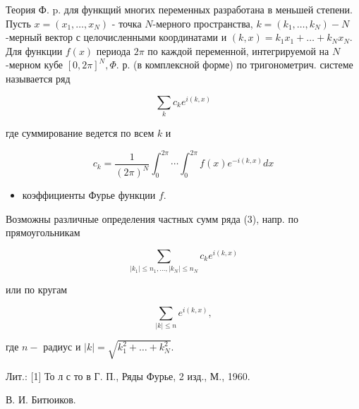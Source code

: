 \documentclass[10pt]{article}
\begin{document}
Теория Ф. p. для функщий многих переменных разработана в меньшей степени. Пусть $x=\left(x_{1}, \ldots, x_{N}\right)$ - точка $N$-мерного пространства, $k=\left(k_{1}, \ldots, k_{N}\right)-N$-мерный вектор с целочисленными координатами и $(k, x)=k_{1} x_{1}+\ldots+k_{N} x_{N}$. Для функции $f(x)$ периода $2 \pi$ по каждой переменной, интегрируемой на $N$-мерном кубе $[0,2 \pi]^{N}, \Phi$. р. (в комплексной форме) по тригонометрич. системе называется ряд



\[

\sum_{k} c_{k} e^{i(k, x)}

\]



где суммирование ведется по всем $k$ и



\[

c_{k}=\frac{1}{(2 \pi)^{N}} \int_{0}^{2 \pi} \cdots \int_{0}^{2 \pi} f(x) e^{-i(k, x)} d x

\]



\begin{itemize}

  \item коэффициенты Фурье функции $f$.

\end{itemize}



Возможны различные определения частных сумм ряда (3), напр. по прямоугольникам



\[

\sum_{\left|k_{1}\right| \leqslant n_{1}, \ldots,\left|k_{N}\right| \leqslant n_{N}} c_{k} e^{i(k, x)}

\]



или по кругам



\[

\sum_{|k| \leqslant n} e^{i(k, x)},

\]



где $n-$ радиус и $|k|=\sqrt{k_{1}^{2}+\ldots+k_{N}^{2}}$.



Лит.: [1] То л с то в Г. П., Ряды Фурье, 2 изд., М., 1960.



В. И. Битюиков.
\end{document}
